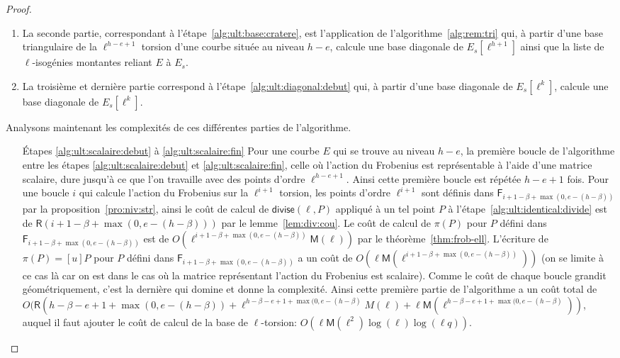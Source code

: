 \documentclass[10pt,a4paper]{book}
\theoremstyle{plain}
\theoremstyle{definition}
\theoremstyle{definition}
\theoremstyle{definition}
\theoremstyle{definition}
\theoremstyle{remark}
\theoremstyle{remark}
\theoremstyle{definition}
\begin{document}
\begin{proof}
\begin{enumerate}
\item La seconde partie, correspondant à l'étape~\ref{alg:ult:base:cratere}, est
l'application de l'algorithme~\ref{alg:rem:tri} qui, à partir d'une base 
triangulaire de la $\ell^{h-e+1}$ torsion d'une courbe située au niveau $h-e$,
calcule une base diagonale de $E_s[\ell^{h+1}]$ ainsi que la liste de
$\ell$-isogénies montantes reliant $E$ à $E_s$.
\item La troisième et dernière partie correspond à 
l'étape~\ref{alg:ult:diagonal:debut} qui, à partir d'une base diagonale de 
$E_s[\ell^k]$, calcule une base diagonale de $E_s[\ell^k]$.
\end{enumerate}
Analysons maintenant les complexités de ces différentes parties de 
l'algorithme.
\begin{enumerate}
\item[\'Etapes \ref{alg:ult:scalaire:debut} à \ref{alg:ult:scalaire:fin}]
Pour une courbe $E$ qui se trouve au niveau $h-e$, la première boucle de l'algorithme entre les étapes \ref{alg:ult:scalaire:debut} et \ref{alg:ult:scalaire:fin}, celle où l'action du 
Frobenius est représentable à l'aide d'une matrice scalaire, dure jusqu'à ce 
que l'on travaille avec des points d'ordre $\ell^{h-e+1}$. Ainsi cette première
 boucle est répétée $h-e+1$ fois. Pour une boucle $i$ qui calcule l'action du 
 Frobenius sur la $\ell^{i+1}$ torsion, les points d'ordre $\ell^{i+1}$ 
sont définis dans $\mathsf{F}_{i+1-\beta+\max(0,e-(h-\beta))}$ par la 
proposition~\ref{pro:niv:str}, ainsi le coût de calcul de 
$\mathsf{divise}(\ell,P)$ appliqué à un tel point $P$ à 
l'étape~\ref{alg:ult:identical:divide} est de $\mathsf{R}(i+1-\beta+\max(0,e-
(h-\beta)))$ par le lemme~\ref{lem:div:cou}. Le coût de calcul de $\pi(P)$ pour
$P$ défini dans $\mathsf{F}_{i+1-\beta+\max(0,e-(h-\beta))}$ est de 
$O(\ell^{i+1-\beta+\max(0,e-(h-\beta))}\mathsf{M}(\ell))$ par le 
théorème~\ref{thm:frob-ell}. L'écriture de $\pi(P)=[u]P$ pour $P$ défini dans 
$\mathsf{F}_{i+1-\beta+\max(0,e-(h-\beta))}$
a un coût de $O(\ell \mathsf{M}(\ell^{i+1- \beta+\max(0,e-(h-\beta))}))$
(on se limite à ce cas là car on est dans le cas où la matrice représentant 
l'action du Frobenius est scalaire). Comme le coût de chaque boucle grandit 
géométriquement, c'est la dernière qui domine et donne la 
complexité. Ainsi cette première partie de l'algorithme a un coût 
 total de $O(\mathsf{R}(h-\beta-e+1 +\max(0,e-(h-\beta))+\ell^{h-\beta-e+1+
\max(0,e-(h-\beta)}M(\ell)+\ell\mathsf{M}(\ell^{h-\beta-e+1+
\max(0,e-(h-\beta)}))$, auquel il faut ajouter le coût de calcul de la base de 
$\ell$-torsion: $O(\ell\mathsf{M}(\ell^2)\log(\ell)\log(\ell q))$.


\end{enumerate}
\end{proof}
\end{document}
